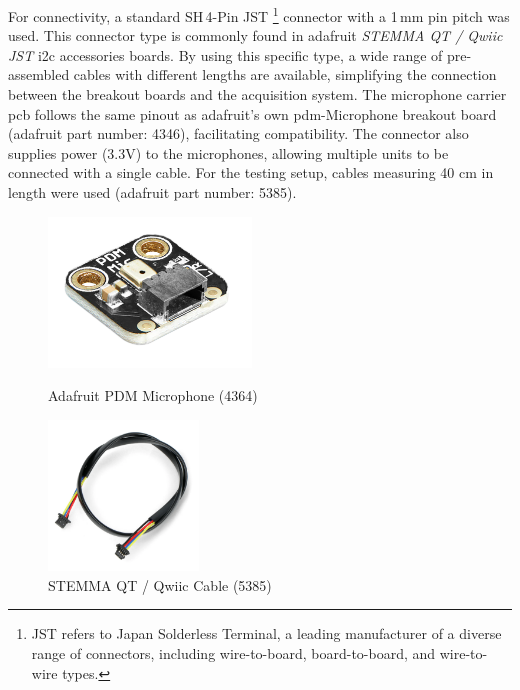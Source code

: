 For connectivity, a standard SH\,4-Pin JST
\footnote{JST refers to Japan Solderless Terminal, a leading manufacturer of a diverse range of connectors, including wire-to-board, board-to-board, and wire-to-wire types.}
connector with a 1\,mm pin pitch was used.
This connector type is commonly found in \gls{adafruit} \textit{STEMMA QT / Qwiic JST} \acrshort{i2c} accessories boards.
By using this specific type, a wide range of pre-assembled cables with different lengths are available, simplifying the connection between the breakout boards and the acquisition system.
The microphone carrier \acrshort{pcb} follows the same pinout as \gls{adafruit}'s own \acrshort{pdm}-Microphone breakout board (\gls{adafruit} part number: 4346), facilitating compatibility.
The connector also supplies power (3.3V) to the microphones, allowing multiple units to be connected with a single cable.
For the testing setup, cables measuring 40 cm in length were used (\gls{adafruit} part number: 5385).
\begin{figure}[h!]
	\centering
	\begin{minipage}{0.49\textwidth}
		\centering
		\includegraphics[height=4.0cm]{images/4_design_acquisition_system/adafruit_pdm_microphone.png}
		\caption{Adafruit PDM Microphone (4364)}
		\label{fig:adafruit_pdm_microphone}
	\end{minipage}
	\begin{minipage}{0.49\textwidth}
		\centering
		\includegraphics[height=4.0cm]{images/4_design_acquisition_system/stemma_qt_qwiic_cable.png}
		\caption{STEMMA QT / Qwiic Cable (5385)}
		\label{fig:stemma_qt_qwiic_cable}
	\end{minipage}
\end{figure}

